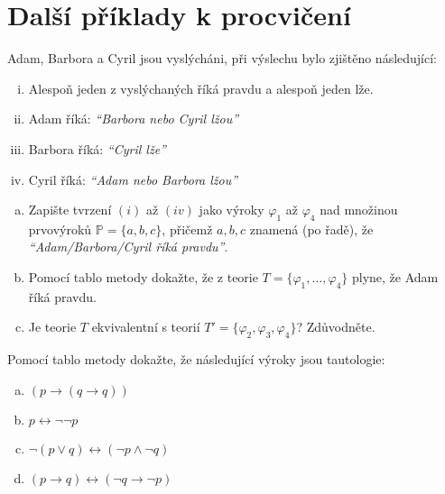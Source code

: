         
\section*{Další příklady k procvičení}


\begin{problem}

    Adam, Barbora a Cyril jsou vyslýcháni, při výslechu bylo zjištěno následující:
    \begin{enumerate}[(i)]\it
        \item Alespoň jeden z vyslýchaných říká pravdu a alespoň jeden lže.
        \item Adam říká: \emph{``Barbora nebo Cyril lžou''}
        \item Barbora říká: \emph{``Cyril lže''}
        \item Cyril říká: \emph{``Adam nebo Barbora lžou''}
    \end{enumerate}
    \begin{enumerate}[(a)]
        \item Zapište tvrzení $(i)$ až $(iv)$ jako výroky $\varphi_1$ až $\varphi_4$ nad množinou prvovýroků $\mathbb{P}=\{a,b,c\}$, přičemž $a,b,c$ znamená (po řadě), že {\it ``Adam/Barbora/Cyril říká pravdu''}.
        \item Pomocí tablo metody dokažte, že z teorie $T = \{\varphi_1, \dots, \varphi_4\}$ plyne, že Adam říká pravdu.
        \item Je teorie $T$ ekvivalentní s teorií $T' = \{\varphi_2, \varphi_3, \varphi_4\}$? Zdůvodněte.    
    \end{enumerate}
    
\end{problem}
        

\begin{problem}

    Pomocí tablo metody dokažte, že následující výroky jsou tautologie:
    \begin{enumerate}[(a)]
        \item $(p\to (q \to q))$
        \item $p \leftrightarrow \neg \neg  p$
        \item $\neg (p \vee q) \leftrightarrow (\neg p \wedge \neg q)$
        \item $(p \to q) \leftrightarrow (\neg q \to \neg p)$    
    \end{enumerate}

\end{problem} 
   


